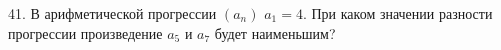 41. В арифметической прогрессии $(a_n)$ $a_1=4.$ При каком значении разности прогрессии произведение $a_5$ и $a_7$ будет наименьшим?\\
